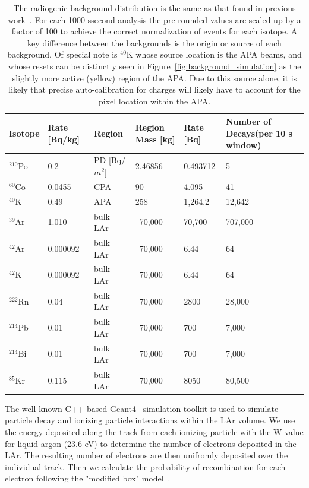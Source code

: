 \begin{table}
\begin{centering}
\begin{tabular}{|p{15mm} p{15mm} p{20mm} p{20mm} p{20mm} p{35mm} |}
 \hline
 Isotope & Rate [Bq/kg] & Region & Region Mass [kg] & Rate [Bq] & Number of Decays\newline (per 10 s window) \\ [0.5ex]
 \hline\hline
  $^{210}$Po & 0.2 & PD [Bq/$m^2$] & 2.46856 & 0.493712 & 5 \\
  $^{60}$Co & 0.0455 & CPA & 90 & 4.095 & 41 \\
  $^{40}$K & 0.49 & APA & 258 & 1,264.2 & 12,642 \\
  $^{39}$Ar & 1.010 & bulk LAr & ~70,000 & 70,700 & 707,000 \\
  $^{42}$Ar & 0.000092 & bulk LAr & ~70,000 & 6.44 & 64 \\
  $^{42}$K  & 0.000092 & bulk LAr & ~70,000 & 6.44 & 64 \\
  $^{222}$Rn & 0.04 & bulk LAr & ~70,000 & 2800 & 28,000 \\
  $^{214}$Pb & 0.01 & bulk LAr & ~70,000 & 700 & 7,000 \\
  $^{214}$Bi & 0.01 & bulk LAr & ~70,000 & 700 & 7,000 \\
  $^{85}$Kr & 0.115 & bulk LAr & ~70,000 & 8050 & 80,500 \\
 \hline
\end{tabular}
\caption{The radiogenic background distribution is the same as that found in previous work~\citep{qpix:shion}.
For each 1000 ssecond analysis the pre-rounded values are scaled up by a factor of 100 to achieve the correct normalization of events for each isotope.
A key difference between the backgrounds is the origin or source of each background.
Of special note is $^{40}$K whose source location is the APA beams, and whose resets can be distinctly seen in Figure~\ref{fig:background_simulation} as the slightly more active (yellow) region of the APA.
Due to this source alone, it is likely that precise auto-calibration for charges will likely have to account for the pixel location within the APA.
}
\label{table:radiogenic_backgrounds}
\end{centering}
\end{table}

The well-known C++ based Geant4~\citep{geant4:AGOSTINELLI2003250} simulation toolkit is used to simulate particle decay and ionizing particle interactions within the LAr volume.
We use the energy deposited along the track from each ionizing particle with the W-value for liquid argon (23.6 eV) to determine the number of electrons deposited in the LAr.
The resulting number of electrons are then unifromly deposited over the individual track.
Then we calculate the probability of recombination for each electron following the "modified box" model~\citep{2013JInst...8P8005A}.

